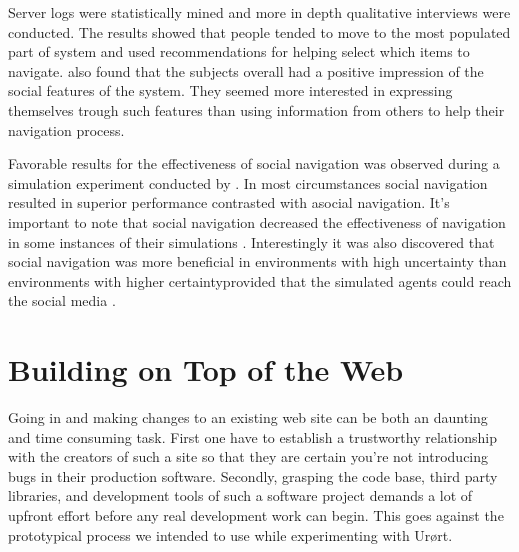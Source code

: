 Server logs were statistically mined and more in depth qualitative interviews
were conducted. The results showed that people tended to move to the most
populated part of system and used recommendations for helping select which
items to navigate. \citeauthor{svensson05} also found that the subjects
overall had a positive impression of the social features of the system. They
seemed more interested in expressing themselves trough such features than
using information from others to help their navigation process.

Favorable results for the effectiveness of social navigation was observed
during a simulation experiment conducted by \citeauthor{riedl03}. In most
circumstances social navigation resulted in superior performance contrasted
with asocial navigation. It's important to note that social navigation
decreased the effectiveness of navigation in some instances of their
simulations \citeyearpar[p.~365]{riedl03}.
Interestingly it was also discovered that social navigation was more
beneficial in environments with high uncertainty%
than environments with higher certainty\dash{}provided that the
simulated agents could reach the social media
\citeyearpar[p.~368]{riedl03}. 

\section{Building on Top of the Web}
\label{section:building.on.top.of.the.web}

Going in and making changes to an existing web site can be both an
daunting and time consuming task. First one have to establish a trustworthy
relationship with the creators of such a site so that they are certain
you're not introducing bugs in their production software. Secondly, grasping
the code base, third party libraries, and development tools of such a software
project demands a lot of upfront effort before any real development work can
begin. This goes against the prototypical process we intended to use while
experimenting with Ur\o{}rt.

